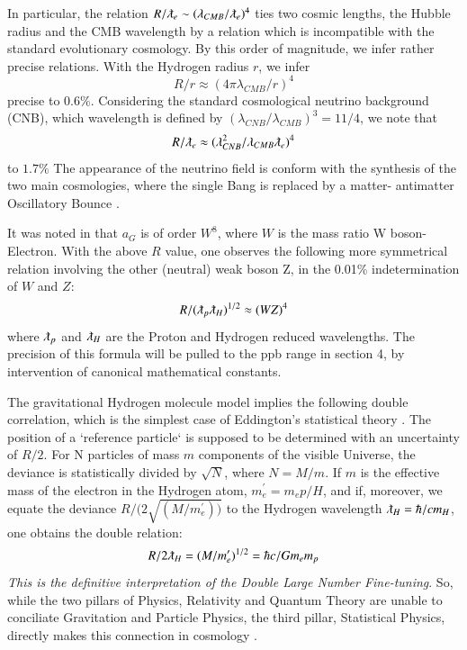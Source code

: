 \documentclass[twoside,draft]{article}
\begin{document}
\begin{sloppypar}
{In particular, the relation $R/\lambdabar_{e} \sim (\lambda_{CMB} / \lambdabar_{e})^{4}$ ties two cosmic lengths, the Hubble radius and the CMB wavelength by a relation which is incompatible with the standard evolutionary cosmology. By this order of magnitude, we infer rather precise relations. With the Hydrogen radius $r$, we infer $$R/r \approx (4\pi \lambda_{CMB} /r)^{4}$$ precise to $0.6\%$. 
Considering the standard cosmological neutrino background (CNB), which wavelength is defined by $(\lambda_{CNB} / \lambda_{CMB})^{3} = 11/4$, we note that $$R/ \lambdabar_{e} \approx
( \lambda_{CNB}^{2} / \lambda_{CMB} \lambdabar_{e} )^{4}$$ to $1.7\%$
The appearance of the neutrino field is conform
with the synthesis of the two main cosmologies, where the single Bang is replaced by a matter-
antimatter Oscillatory Bounce \cite{Sanchez2}.

It was noted in \cite{Carr} that $a_{G}$ is of order $W^{8}$, where $W$ is the mass ratio W boson-
Electron. With the above $R$ value, one observes the following more symmetrical relation involving
the other (neutral) weak boson Z, in the 0.01\% indetermination of $W$ and $Z$:
\begin{equation}
R/(\lambdabar_{p}\lambdabar_{H})^{1/2}\approx (WZ)^4
\end{equation}
where $\lambdabar_{p}$ and $\lambdabar_{H}$ are the Proton and Hydrogen reduced wavelengths. The precision of this formula will be pulled to the ppb range in section 4, by intervention of canonical mathematical constants.

The gravitational Hydrogen molecule model \cite{Sanchez1} implies the following double correlation,
which is the simplest case of Eddington's statistical theory \cite{Eddy}. The position of a `reference particle`
is supposed to be determined with an uncertainty of ${R/2}$. For N particles of mass $m$ components of the visible Universe, the deviance is statistically divided by $\sqrt{N}$, where $N = M/m$. If $m$ is the effective mass of the electron in the Hydrogen atom, $m^{\prime}_{e} = m_{e} p/H$, and if, moreover, we equate
the deviance $R/(2\sqrt{(M/m^{\prime}_{e}))}$ to the Hydrogen wavelength $\lambdabar_{H} = \hbar/c m_{H}$, one obtains the double relation:
\begin{equation}
R/2\lambdabar_{H} = (M/m^{\prime}_{e})^{1/2} = \hbar c/G m_{e} m_{p}
\end{equation}
\textit{This is the definitive interpretation of the Double Large Number Fine-tuning}. So, while the two
pillars of Physics, Relativity and Quantum Theory are unable to conciliate Gravitation and Particle
Physics, the third pillar, Statistical Physics, directly makes this connection in cosmology \cite{Eddy}.

}
\end{sloppypar}
\end{document}
